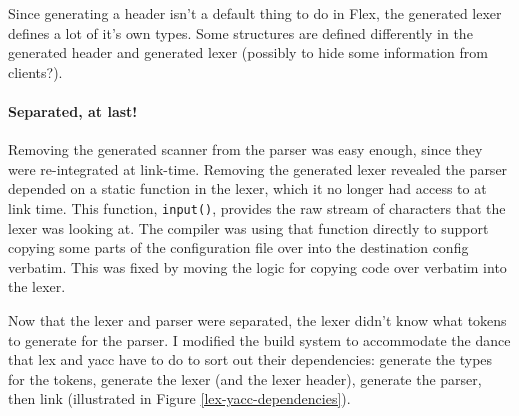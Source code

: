 \documentclass[12pt]{article}
\newcommand{\code}[1]{{\tt #1}}
\begin{document}
Since generating a header isn't a default thing to do in Flex, the generated
lexer defines a lot of it's own types. Some structures are defined differently
in the generated header and generated lexer (possibly to hide some information
from clients?).

\begin{comment}
\begin{figure}
\label{include-c-h}\caption{This generated type errors}
In the lex.yy.h:
\begin{verbatim}
#ifndef YY_STRUCT_YY_BUFFER_STATE
#define YY_STRUCT_YY_BUFFER_STATE
struct yy_buffer_state
    /* stuff */
#endif
\end{verbatim}

In lex.yy.c:
\begin{verbatim}
#ifndef YY_STRUCT_YY_BUFFER_STATE
#define YY_STRUCT_YY_BUFFER_STATE
struct yy_buffer_state
    /* stuff */
    /* Even more stuff, not defined before. */
#endif
\end{verbatim}

In the parser:
\begin{verbatim}
#include "lex.yy.h"
[... snip ...]
#include "lex.yy.c"
\end{verbatim}
\end{figure}
\end{comment}

\paragraph{Separated, at last!}
Removing the generated scanner from the parser was easy enough, since they were
re-integrated at link-time. Removing the generated lexer revealed the 
parser depended on a static function in the lexer, which it no longer had
access to at link time. This function, \code{input()}, provides the raw
stream of characters that the lexer was looking at. The compiler was using that
function directly to support copying some parts of the configuration file over
into the destination config verbatim. This was fixed by moving the logic for
copying code over verbatim into the lexer.

Now that the lexer and parser were separated, the lexer didn't know what tokens
to generate for the parser. I modified the build system to accommodate the dance
that lex and yacc have to do to sort out their dependencies: generate the types
for the tokens, generate the lexer (and the lexer header), generate the parser,
then link (illustrated in Figure \ref{lex-yacc-dependencies}).
\end{document}

